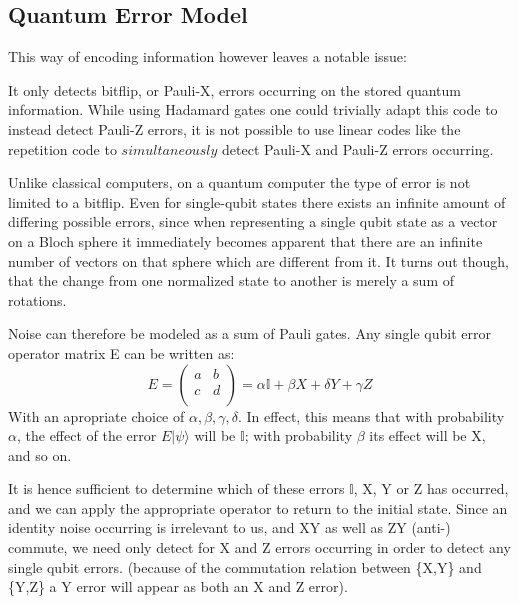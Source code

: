 \subsection{Quantum Error Model}
This way of encoding information however leaves a notable
issue:

It only detects bitflip, or Pauli-X, errors occurring on
the stored quantum information. While using Hadamard gates one
could trivially adapt this code to instead detect Pauli-Z errors,
it is not possible to use linear codes like the repetition code
to $simultaneously$ detect Pauli-X and Pauli-Z errors occurring.

Unlike classical computers, on a quantum computer the type of error
 is not limited
to a bitflip. Even for single-qubit states there exists an
infinite amount of differing possible errors, since when representing a single
qubit state as a vector on a Bloch sphere it immediately becomes apparent
that there are an infinite number of vectors on that sphere which are different
from it. It turns out though, that the change from one normalized
state to another is merely a sum of rotations.

Noise can therefore be modeled as a sum of Pauli gates.
Any single qubit error operator matrix E can be written as:
\begin{equation}
    E =
    \left(
    \begin{array}{cc}
        a & b \\
        c & d \\
    \end{array}
    \right) = 
    \alpha \mathbb{I} + \beta X + \delta Y + \gamma Z
\end{equation}
With an apropriate choice of $\alpha, \beta, \gamma, \delta$.
In effect, this means that with probability $\alpha$, the effect of the
error $E|\psi\rangle$ will be $\mathbb{I}$; with probability $\beta$ its effect
will be X, and so on.

It is hence sufficient to determine which of these errors $\mathbb{I}$, 
X, Y or Z has occurred, and we can apply the appropriate operator to return to the 
initial state.
Since an identity noise occurring is irrelevant to us, and XY as
well as ZY (anti-) commute, we need only detect for X and Z
errors occurring in order to detect any single qubit errors. 
(because of the commutation relation between \{X,Y\} and \{Y,Z\} a Y error
will appear as both an X and Z error).